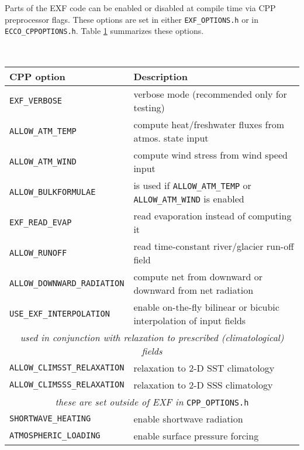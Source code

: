 Parts of the EXF code can be enabled or disabled at compile time
via CPP preprocessor flags. These options are set in either
\texttt{EXF\_OPTIONS.h} or in \texttt{ECCO\_CPPOPTIONS.h}.
Table \ref{tab:pkg:exf:cpp} summarizes these options.

\begin{table}[b!]
\centering
  \label{tab:pkg:exf:cpp}
  {\footnotesize
    \begin{tabular}{|l|l|}
      \hline 
      \textbf{CPP option}  &  \textbf{Description}  \\
      \hline \hline
        \texttt{EXF\_VERBOSE} & 
          verbose mode (recommended only for testing) \\
        \texttt{ALLOW\_ATM\_TEMP} & 
          compute heat/freshwater fluxes from atmos. state input \\
        \texttt{ALLOW\_ATM\_WIND} & 
          compute wind stress from wind speed input\\
        \texttt{ALLOW\_BULKFORMULAE} & 
          is used if \texttt{ALLOW\_ATM\_TEMP} or 
          \texttt{ALLOW\_ATM\_WIND} is enabled \\
        \texttt{EXF\_READ\_EVAP} & read evaporation instead of computing it \\
        \texttt{ALLOW\_RUNOFF} & read time-constant river/glacier run-off field \\
        \texttt{ALLOW\_DOWNWARD\_RADIATION} & compute net from downward or downward from net radiation \\
        \texttt{USE\_EXF\_INTERPOLATION} & enable on-the-fly bilinear or bicubic interpolation of input fields \\
      \hline
         \multicolumn{2}{|c|}{\textit{used in conjunction with relaxation to prescribed (climatological) fields}} \\
         \hline
        \texttt{ALLOW\_CLIMSST\_RELAXATION} &
          relaxation to 2-D SST climatology \\
        \texttt{ALLOW\_CLIMSSS\_RELAXATION} &
          relaxation to 2-D SSS climatology  \\
      \hline
         \multicolumn{2}{|c|}{\textit{these are set outside of EXF in} \texttt{CPP\_OPTIONS.h}} \\
         \hline
        \texttt{SHORTWAVE\_HEATING} & enable shortwave radiation \\
        \texttt{ATMOSPHERIC\_LOADING} & enable surface pressure forcing \\
      \hline
    \end{tabular}
  }
  \caption{~}
\end{table}


